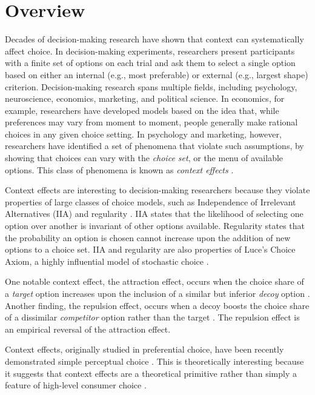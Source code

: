 \section{Overview}
Decades of decision-making research have shown that context can systematically affect choice. In decision-making experiments, researchers present participants with a finite set of options on each trial and ask them to select a single option based on either an internal (e.g., most preferable) or external (e.g., largest shape) criterion. Decision-making research spans multiple fields, including psychology, neuroscience, economics, marketing, and political science. In economics, for example, researchers have developed models based on the idea that, while preferences may vary from moment to moment, people generally make rational choices in any given choice setting. In psychology and marketing, however, researchers have identified a set of phenomena that violate such assumptions, by showing that choices can vary with the \textit{choice set}, or the menu of available options. This class of phenomena is known as \textit{context effects} .

Context effects are interesting to decision-making researchers because they violate properties of large classes of choice models, such as Independence of Irrelevant Alternatives (IIA) \parencite{ray1973independence} and regularity \parencite{mackay1995probabilistic,marley1989random}. IIA states that the likelihood of selecting one option over another is invariant of other options available. Regularity states that the probability an option is chosen cannot increase upon the addition of new options to a choice set. IIA and regularity are also properties of Luce's Choice Axiom, a highly influential model of stochastic choice \parencite{luceChoiceAxiomTwenty1977a, luce1959individual}. 

One notable context effect, the attraction effect, occurs when the choice share of a \textit{target} option increases upon the inclusion of a similar but inferior \textit{decoy} option \parencite{huberAddingAsymmetricallyDominated1982d}. Another finding, the repulsion effect, occurs when a decoy boosts the choice share of a dissimilar \textit{competitor} option rather than the target \parencite{simonson2014vices}. The repulsion effect is an empirical reversal of the attraction effect. 

Context effects, originally studied in preferential choice, have been recently demonstrated simple perceptual choice \parencite{trueblood2013not,spektorWhenGoodLooks2018b,liaoInfluenceDistanceDecoy2021,spektorRepulsionEffectPreferential2022,yearsleyContextEffectsSimilarity2022,truebloodPhantomDecoyEffect2017c, turnerCompetingTheoriesMultialternative2018a, evansImpactPresentationOrder2021}. This is theoretically interesting because it suggests that context effects are a theoretical primitive rather than simply a feature of high-level consumer choice \parencite{trueblood2013not}. 

